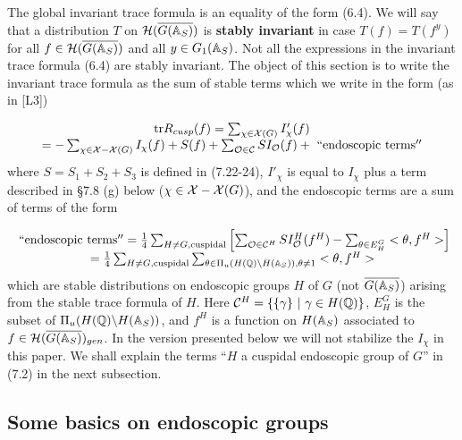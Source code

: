 The global invariant trace formula is an equality of the form (6.4).
We will say that a distribution $T$ on ${\cal{H}}(\overline{G(\mathbb{A} _S)})$ is 
\textbf{stably invariant} in case $T(f)=T(f^y)$ for all
$f\in {\cal{H}}(\overline{G(\mathbb{A} _S)})$ and all
$y\in G_1(\mathbb{A} _S)$. Not all the expressions
in the invariant trace formula (6.4) are stably invariant.
The object
of this section is to write the invariant trace formula
as the sum of stable
terms which we write in the form (as in [L3])

\begin{equation}
\begin{array}{c}
{\rm tr}R_{cusp}(f)=
\sum_{\chi \in {\cal{X}}(G)}I'_\chi (f)\\
=-\sum_{\chi \in {\cal{X}}-{\cal{X}}(G)}I_\chi (f)
+S(f)
+\sum_{\mathcal{O}\in \mathcal{C}}SI_{\mathcal{O}}(f)
+{\rm\ ``endoscopic\ terms''}
\end{array}
\end{equation}
where $S=S_1+S_2+S_3$ is defined in (7.22-24),
$I'_\chi$ is equal to $I_\chi$ plus a term described in
\S 7.8 (g) below ($\chi\in
{\cal{X}}-{\cal{X}}(G)$), and
the endoscopic terms are a sum of terms of the form

\begin{equation}
\begin{array}{c}
{\rm\ ``endoscopic\ terms''}
=
{1\over 4}
\sum_{ H\not= G, {\rm cuspidal}}
\left[
\sum_{{\mathcal{O}}\in {\mathcal{C}}^H}SI^H_{\mathcal{O}}(f^H)
-\sum_{\theta\in E_H^G}<\theta,f^H>
\right]\\
={1\over 4}
\sum_{ H\not= G, {\rm cuspidal}}
\sum_{
\theta\in \Pi_u(H(\mathbb{Q} )\backslash H(\mathbb{A} _S)),
\theta\not= 1}
<\theta,f^H>
\end{array}
\end{equation}
which are stable distributions on endoscopic groups $H$ of $G$
(not $\overline{G(\mathbb{A} _S)}$)
arising from the stable trace formula of $H$.
Here ${\cal{C}}^H=\{\{\gamma\}\ |\ \gamma\in H(\mathbb{Q} )\}$,
$E_H^G$ is the subset of
$\Pi_u(H(\mathbb{Q} )\backslash {H(\mathbb{A}_S)})$,
and $f^H$ is a function on
$H(\mathbb{A} _S)$ associated to
$f\in {\cal{H}}(\overline{G(\mathbb{A} _S)})_{gen}$.
In the version presented below we will not
stabilize the $I_\chi$ in this paper.
We shall explain the terms ``$H$ a cuspidal endoscopic group of
$G$'' in (7.2) in the next subsection.

\subsection{Some basics on endoscopic groups}

